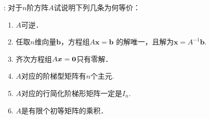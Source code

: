 \documentclass[UTF8]{ctexart}
\newcommand{\bx}{{\bm x}}
\newcommand{\bb}{{\bm b}}
\begin{document}
\vspace{2cm}


:
对于$n$阶方阵$A$试说明下列几条为何等价：
\begin{enumerate}
		\item $A$可逆．
		\item 任取$n$维向量$\bb$，方程组$A \bx = \bb$ 的解唯一，且解为$\bx = A^{-1}\bb$.
\item 齐次方程组$A\bx = {\bf 0}$只有零解．
\item $A$对应的阶梯型矩阵有$n$个主元.
\item $A$对应的行简化阶梯形矩阵一定是$I_n$.
\item $A$是有限个初等矩阵的乘积．
	\end{enumerate}
\end{document}
